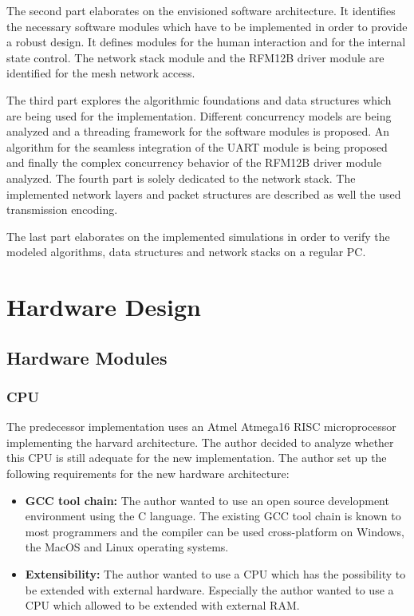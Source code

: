 The second part elaborates on the envisioned software architecture. It identifies the necessary software modules which have to be implemented in order to provide a robust design. It defines modules for the human interaction and for the internal state control. The network stack module and the RFM12B driver module are identified for the mesh network access.

The third part explores the algorithmic foundations and data structures which are being used for the implementation. Different concurrency models are being analyzed and a threading framework for the software modules is proposed. An algorithm for the seamless integration of the UART module is being proposed and finally the complex concurrency behavior of the RFM12B driver module analyzed.
The fourth part is solely dedicated to the network stack. The implemented network layers and packet structures are described as well the used transmission encoding.

The last part elaborates on the implemented simulations in order to verify the modeled algorithms, data structures and network stacks on a regular PC.

\chapter{Hardware Design}%
\section{Hardware Modules}%
\subsection{CPU} %
\label{sub:cpu}
The predecessor implementation uses an Atmel Atmega16 RISC microprocessor implementing the harvard architecture. The author decided to analyze whether this CPU is still adequate for the new implementation. The author set up the following requirements for the new hardware architecture:

\begin{itemize}
    \item \textbf{GCC tool chain:} The author wanted to use an open source development environment using the C language. The existing GCC tool chain is known to most programmers and the compiler can be used cross-platform on Windows, the MacOS and Linux operating systems.
    \item \textbf{Extensibility:} The author wanted to use a CPU which has the possibility to be extended with external hardware. Especially the author wanted to use a CPU which allowed to be extended with external RAM.
\end{itemize}

